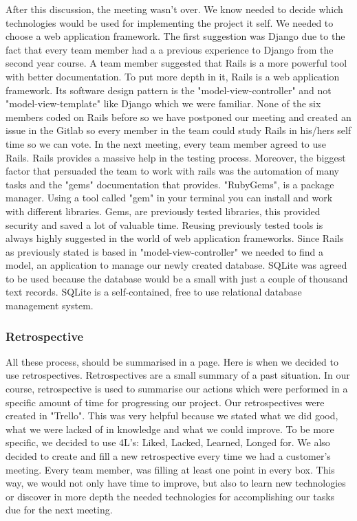 \documentclass{l3proj}
\begin{document}
 After this discussion, the meeting wasn't over. We know needed to decide which technologies would be used for implementing the project it self. We needed to choose a web application framework. The first suggestion was Django due to the fact that every team member had a a previous experience to Django from the second year course. A team member suggested that Rails is a more powerful tool with better documentation. To put more depth in it, Rails is a web application framework. Its software design pattern is the "model-view-controller" and not "model-view-template" like Django which we were familiar. None of the six members coded on Rails before so we have postponed our meeting and created an issue in the Gitlab so every member in the team could study Rails in his/hers self time so we can vote. In the next meeting, every team member agreed to use Rails. Rails provides a massive help in the testing process. Moreover, the biggest factor that persuaded the team to work with rails was the automation of many tasks and the "gems" documentation that provides. "RubyGems", is a package manager. Using a tool called "gem" in your terminal you can install and work with different libraries. Gems, are previously tested libraries, this provided security and saved a lot of valuable time. Reusing previously tested tools is always highly suggested in the world of web application frameworks.
  Since Rails as previously stated is based in "model-view-controller" we needed to find a model, an application to manage our newly created database. SQLite was agreed to be used because the database would be a small with just a couple of thousand text records. SQLite is a self-contained, free to use relational database management system.
 
 \subsubsection{Retrospective}
\label{retrospective}
 
 All these process, should be summarised in a page. Here is when we decided to use retrospectives. Retrospectives are a small summary of a past situation. In our course, retrospective is used to summarise our actions which were performed in a specific amount of time for progressing our project. Our retrospectives were created in "Trello". This was very helpful because we stated what we did good, what we were lacked of in knowledge and what we could improve. To be more specific, we decided to use 4L's: Liked, Lacked, Learned, Longed for. We also decided to create and fill a new retrospective every time we had a customer's meeting. Every team member, was filling at least one point in every box. This way, we would not only have time to improve, but also to learn new technologies or discover in more depth the needed technologies for accomplishing our tasks due for the next meeting.
\end{document}
